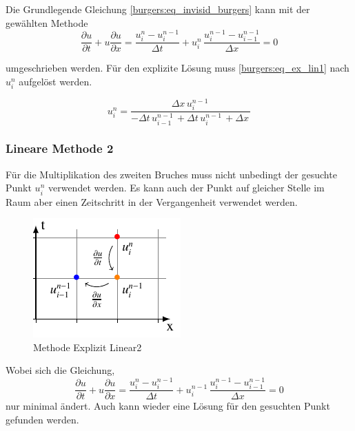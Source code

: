 	Die Grundlegende Gleichung \ref{burgers:eq_invisid_burgers} kann mit der gewählten Methode
	\begin{equation}
	  	\frac {\partial u}{\partial t}+u{\frac {\partial u}{\partial x}} = \frac{u_{i}^{n}-u_{i}^{n-1}}{\Delta t}+ u_{i}^{n}\, \frac{u_{i}^{n-1}-u_{i-1}^{n-1}}{\Delta x}=0
	  	  \label{burgers:eq_ex_lin1}
	  	\end{equation}
	  	
	  	umgeschrieben werden.
	  	Für den explizite Lösung muss \ref{burgers:eq_ex_lin1} nach $ u_{i}^{n}$ aufgelöst werden.
	  	
	  	\begin{equation}
	  u_{i}^{n} = \frac{\Delta{x}\, u^{n-1}_{i}\,}{- \Delta{t}\, u^{n-1}_{i-1}\, + \Delta{t}\, u^{n-1}_{i}\, + \Delta{x}\,}
		  \label{burgers:eq_ex_sol_lin1}
	\end{equation}

	
	
\subsubsection{Lineare Methode 2}
	
	
	Für die Multiplikation des zweiten Bruches muss nicht unbedingt der gesuchte Punkt $u_{i}^{n}$ verwendet werden.
	Es kann auch der Punkt auf gleicher Stelle im Raum aber einen Zeitschritt in der Vergangenheit verwendet werden.
	
	
     \begin{figure}
	\centering
	\includegraphics[height=.4\textwidth]{papers/burgers/BurgersEquation/tikz/Linear2/Linear2.pdf}
	\caption{Methode Explizit Linear2}
	\label{burgers:fig:Linear2}
	\end{figure}

	Wobei sich die Gleichung,
	\begin{equation}
			\frac {\partial u}{\partial t}+u{\frac {\partial u}{\partial x}} = \frac{u_{i}^{n}-u_{i}^{n-1}}{\Delta t}+ u_{i}^{n-1}\, \frac{u_{i}^{n-1}-u_{i-1}^{n-1}}{\Delta x}=0
		\label{burgers:eq_ex_lin2}
	\end{equation}
	 nur minimal ändert.
	 Auch kann wieder eine Lösung für den gesuchten Punkt gefunden werden.
	

